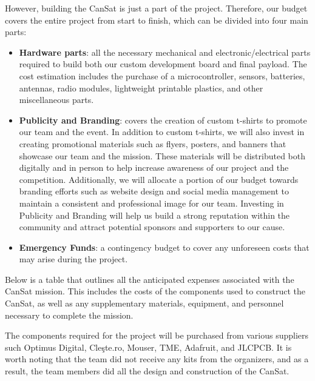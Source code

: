 However, building the CanSat is just a part of the project. Therefore, our budget covers the entire project from start to finish, which can be divided into four main parts: 
\begin{itemize}[leftmargin=1cm, itemindent=0.25cm, noitemsep, topsep=0pt, label=$\bullet$]
    \item \textbf{Hardware parts}: all the necessary mechanical and electronic/electrical parts required to build both our custom development board and final payload. The cost estimation includes the purchase of a microcontroller, sensors, batteries, antennas, radio modules, lightweight printable plastics, and other miscellaneous parts.
    \item \textbf{Publicity and Branding}: covers the creation of custom t-shirts to promote our team and the event. In addition to custom t-shirts, we will also invest in creating promotional materials such as flyers, posters, and banners that showcase our team and the mission. These materials will be distributed both digitally and in person to help increase awareness of our project and the competition. Additionally, we will allocate a portion of our budget towards branding efforts such as website design and social media management to maintain a consistent and professional image for our team. Investing in Publicity and Branding will help us build a strong reputation within the community and attract potential sponsors and supporters to our cause.
    \item \textbf{Emergency Funds}: a contingency budget to cover any unforeseen costs that may arise during the project.
\end{itemize}

Below is a table that outlines all the anticipated expenses associated with the CanSat mission. This includes the costs of the components used to construct the CanSat, as well as any supplementary materials, equipment, and personnel necessary to complete the mission.

The components required for the project will be purchased from various suppliers such Optimus Digital, Cle\c{s}te.ro, Mouser, TME, Adafruit, and JLCPCB. It is worth noting that the team did not receive any kits from the organizers, and as a result, the team members did all the design and construction of the CanSat.

